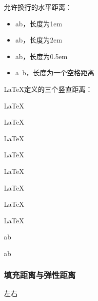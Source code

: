 \documentclass{ctexart}
\begin{document}
            允许换行的水平距离：
            \begin{itemize}
                \item a\quad b，长度为1em
                \item a\qquad b，长度为2em
                \item a\enskip b，长度为0.5em
                \item a\ b，长度为一个空格距离
            \end{itemize}

            LaTeX定义的三个竖直距离：

            \parbox[t]{.2\textwidth}{\LaTeX\par \LaTeX}
            \parbox[t]{.2\textwidth}{\LaTeX\par\smallskip \LaTeX}
            \parbox[t]{.2\textwidth}{\LaTeX\par\medskip \LaTeX}
            \parbox[t]{.2\textwidth}{\LaTeX\par\bigskip \LaTeX}

        
            \newlength{\mylatexlength} %
            \setlength{\mylatexlength}{10pt} %
            \addtolength{\mylatexlength}{-5pt} %
            a\hspace{\mylatexlength}b 

            a\hspace{5pt}b

        \subsubsection{填充距离与弹性距离}
            左\hfill 右
\end{document}
